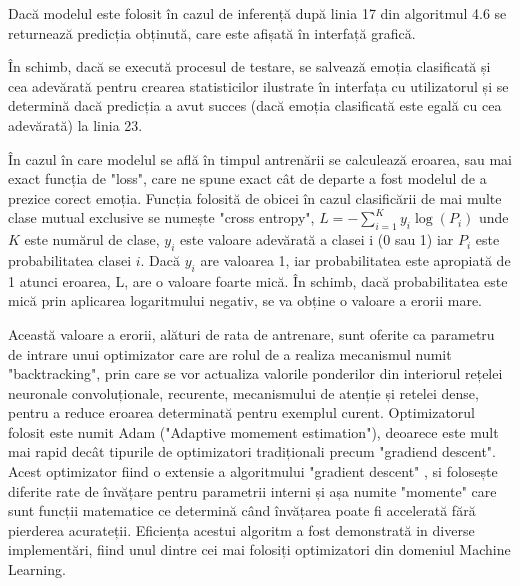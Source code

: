 \documentclass[a4paper,12pt]{book}
\begin{document}
		Dacă modelul este folosit în cazul de inferență după linia 17 din algoritmul 4.6 se returnează predicția obținută, care este afișată în interfață grafică. \par
		În schimb, dacă se execută procesul de testare, se salvează emoția clasificată și cea adevărată pentru crearea statisticilor ilustrate în interfața cu utilizatorul și se determină dacă predicția a avut succes (dacă emoția clasificată este egală cu cea adevărată) la linia 23. \par
		În cazul în care modelul se află în timpul antrenării se calculează eroarea, sau mai exact funcția de "loss", care ne spune exact cât de departe a fost modelul de a prezice corect emoția. Funcția folosită de obicei în cazul clasificării de mai multe clase mutual exclusive se numește "cross entropy", $L = -\sum_{i=1}^{K} y_i \log(P_i)$ unde $K$ este numărul de clase, $y_i$ este valoare adevărată a clasei i (0 sau 1) iar $P_i$ este probabilitatea clasei $i$. Dacă $y_i$ are valoarea 1, iar probabilitatea este apropiată de 1 atunci eroarea, L, are o valoare foarte mică. În schimb, dacă probabilitatea este mică prin aplicarea logaritmului negativ, se va obține o valoare a erorii mare. \par
		Această valoare a erorii, alături de rata de antrenare, sunt oferite ca parametru de intrare unui optimizator care are rolul de a realiza mecanismul numit "backtracking", prin care se vor actualiza valorile ponderilor din interiorul rețelei neuronale convoluționale, recurente, mecanismului de atenție și retelei dense, pentru a reduce eroarea determinată pentru exemplul curent. Optimizatorul folosit este numit Adam \cite{adam} ("Adaptive momement estimation"), deoarece este mult mai rapid decât tipurile de optimizatori tradiționali precum "gradiend descent". Acest optimizator fiind o extensie a algoritmului "gradient descent" , si folosește diferite rate de învățare pentru parametrii interni și așa numite "momente" care sunt funcții matematice ce determină când învățarea poate fi accelerată fără pierderea acurateții. Eficiența acestui algoritm a fost demonstrată in diverse implementări, fiind unul dintre cei mai folosiți optimizatori din domeniul Machine Learning.
		
\end{document}
